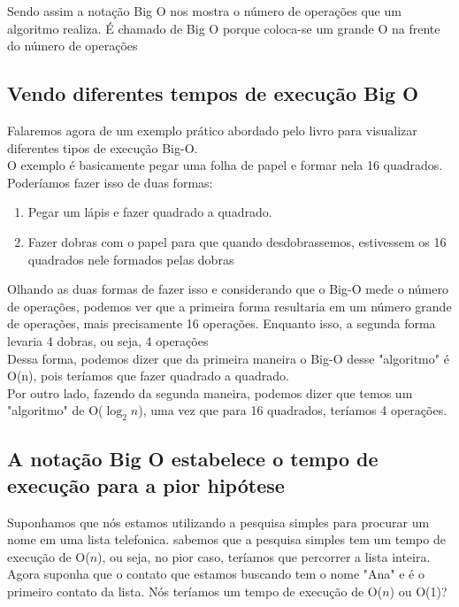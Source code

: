 \documentclass{report}
\begin{document}
	Sendo assim a notação Big O nos mostra o número de operações que um algoritmo realiza. É chamado de Big O porque coloca-se um grande O na frente do número de operações
	
	\subsection{Vendo diferentes tempos de execução Big O}
	
	Falaremos agora de um exemplo prático abordado pelo livro para visualizar diferentes tipos de execução Big-O. \\
	
	O exemplo é basicamente pegar uma folha de papel e formar nela 16 quadrados. Poderíamos fazer isso de duas formas:
	
	\begin{enumerate}
		\item Pegar um lápis e fazer quadrado a quadrado.
		\item Fazer dobras com o papel para que quando desdobrassemos, estivessem os 16 quadrados nele formados pelas dobras
	\end{enumerate}
	
	Olhando as duas formas de fazer isso e considerando que o Big-O mede o número de operações, podemos ver que a primeira forma resultaria em um número grande de operações, mais precisamente 16 operações. Enquanto isso, a segunda forma levaria 4 dobras, ou seja, 4 operações \\ 
	
	Dessa forma, podemos dizer que da primeira maneira o Big-O desse "algoritmo" é O(n), pois teríamos que fazer quadrado a quadrado.\\
	
	Por outro lado, fazendo da segunda maneira, podemos dizer que temos um "algoritmo" de O($\log_{2}n$), uma vez que para 16 quadrados, teríamos 4 operações.
	
	\subsection{A notação Big O estabelece o tempo de execução para a pior hipótese}
	
	Suponhamos que nós estamos utilizando a pesquisa simples para procurar um nome em uma lista telefonica. sabemos que a pesquisa simples tem um tempo de execução de O($n$), ou seja, no pior caso, teríamos que percorrer a lista inteira. Agora suponha que o contato que estamos buscando tem o nome "Ana" e é o primeiro contato da lista. Nós teríamos um tempo de execução de O($n$) ou O(1)? \\
	
\end{document}
